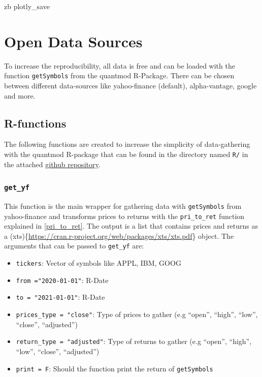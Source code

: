 \documentclass[
  oneside]{book}
\providecommand{\tightlist}{%
  \setlength{\itemsep}{0pt}\setlength{\parskip}{0pt}}
\begin{document}
zb plotly\_save

\hypertarget{open-data-sources}{%
\chapter{Open Data Sources}\label{open-data-sources}}

To increase the reproducibility, all data is free and can be loaded with the function \texttt{getSymbols} from the quantmod R-Package. There can be chosen between different data-sources like yahoo-finance (default), alpha-vantage, google and more.

\hypertarget{r-functions-1}{%
\section{R-functions}\label{r-functions-1}}

The following functions are created to increase the simplicity of data-gathering with the quantmod R-package that can be found in the directory named \texttt{R/} in the attached \href{https://github.com/AxelCode-R/Master-Thesis}{github repository}.

\hypertarget{get_yf}{%
\subsection{\texorpdfstring{\texttt{get\_yf}}{get\_yf}}\label{get_yf}}

This function is the main wrapper for gathering data with \texttt{getSymbols} from yahoo-finance and transforms prices to returns with the \texttt{pri\_to\_ret} function explained in \ref{pri_to_ret}. The output is a list that contains prices and returns as a (xts)\{\url{https://cran.r-project.org/web/packages/xts/xts.pdf}\} object. The arguments that can be passed to \texttt{get\_yf} are:

\begin{itemize}
\tightlist
\item
  \texttt{tickers}: Vector of symbols like APPL, IBM, GOOG
\item
  \texttt{from\ ="2020-01-01"}: R-Date
\item
  \texttt{to\ =\ "2021-01-01"}: R-Date
\item
  \texttt{prices\_type\ =\ "close"}: Type of prices to gather (e.g ``open'', ``high'', ``low'', ``close'', ``adjusted'')
\item
  \texttt{return\_type\ =\ "adjusted"}: Type of returns to gather (e.g ``open'', ``high'', ``low'', ``close'', ``adjusted'')
\item
  \texttt{print\ =\ F}: Should the function print the return of \texttt{getSymbols}
\end{itemize}
\end{document}
